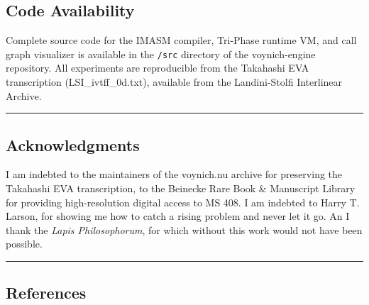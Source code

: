 \documentclass[12pt,a4paper]{article}
\begin{document}
\subsection{Code Availability}

Complete source code for the IMASM compiler, Tri-Phase runtime VM, and call graph visualizer is available in the \texttt{/src} directory of the voynich-engine repository. All experiments are reproducible from the Takahashi EVA transcription (LSI\_ivtff\_0d.txt), available from the Landini-Stolfi Interlinear Archive.

\begin{center}
\rule{0.5\textwidth}{0.4pt}
\end{center}

\subsection{Acknowledgments}

I am indebted to the maintainers of the voynich.nu archive for preserving the Takahashi EVA transcription, to the Beinecke Rare Book \& Manuscript Library for providing high-resolution digital access to MS 408. I am indebted to Harry T. Larson, for showing me how to catch a rising problem and never let it go. An I thank the \emph{Lapis Philosophorum}, for which without this work would not have been possible.

\begin{center}
\rule{0.5\textwidth}{0.4pt}
\end{center}

\subsection{References}
\end{document}
